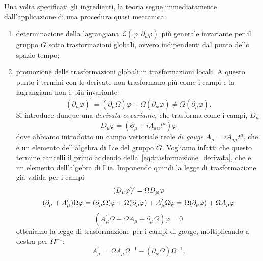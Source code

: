 \documentclass[italian,a4paper]{article}
\theoremstyle{definition}
\newcommand{\lagr}{\ensuremath{\mathscr{L}}}
\newcommand{\dimu}{\ensuremath{\partial_{\mu}}}
\newcommand{\Dimu}{\ensuremath{D_{\mu}}}
\begin{document}
Una volta specificati gli ingredienti, la teoria segue immediatamente
dall'applicazione di una procedura quasi meccanica:
\begin{enumerate}
    \item determinazione della lagrangiana $\lagr(\varphi,
        \dimu\varphi)$ pi\`u generale invariante per il gruppo $G$ sotto
        trasformazioni globali, ovvero indipendenti dal punto dello
        spazio-tempo;
    \item promozione delle trasformazioni globali in trasformazioni locali.
        A questo punto i termini con le derivate non trasformano pi\`u come
        i campi e la lagrangiana non \`e pi\`u invariante:
        \begin{equation}
            (\dimu\varphi)^\prime = (\dimu \Omega)\varphi +
            \Omega(\dimu\varphi)\neq \Omega(\dimu \varphi).
            \label{eq:trasformazione_derivata}
        \end{equation}
        Si introduce dunque una \emph{derivata covariante}, che trasforma
        come i campi, $\Dimu$
        \begin{equation*}
            \Dimu \varphi = (\dimu + i A_{a\mu}t^{a})\varphi
        \end{equation*}
        dove abbiamo introdotto un campo vettoriale reale \emph{di gauge} $A_\mu = i A_{a\mu}t^{a}$,
        che \`e un elemento dell'algebra di Lie del gruppo $G$. Vogliamo
        infatti che questo termine cancelli il primo addendo
        della~\eqref{eq:trasformazione_derivata}, che \`e un elemento
        dell'algebra di Lie.
        Imponendo quindi la legge di trasformazione gi\`a valida per i campi
        \begin{equation*}
            (\Dimu \varphi)^\prime = \Omega \Dimu \varphi\\
        \end{equation*}
        \begin{equation*}
            (\dimu + A^\prime_{\mu})\Omega \varphi = (\dimu \Omega)\varphi +
            \Omega (\dimu \varphi) + A^\prime_\mu\Omega\varphi = \Omega(\dimu
            \varphi) + \Omega A_\mu \varphi\\
        \end{equation*}
        \begin{equation*}
            (A^\prime_\mu\Omega - \Omega A_\mu + \dimu \Omega)\varphi = 0
        \end{equation*}
        otteniamo la legge di trasformazione per i campi di gauge,
        moltiplicando a destra per $\Omega^{-1}$:
        \begin{equation}
            A_{\mu}^\prime = \Omega A_\mu \Omega^{-1} - (\dimu \Omega)
            \Omega^{-1}.
            \label{eq:trasformazione_campi_gauge}
        \end{equation}


\end{enumerate}
\end{document}
